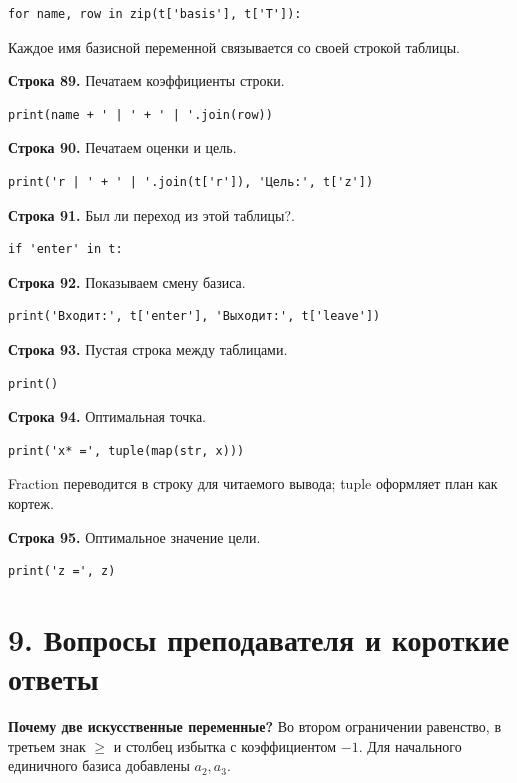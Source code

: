 \documentclass[12pt,a4paper]{article}
\begin{document}
\begin{Verbatim}[fontsize=\small,breaklines=true,breakanywhere=true]
    for name, row in zip(t['basis'], t['T']):
\end{Verbatim}
Каждое имя базисной переменной связывается со своей строкой таблицы.
\par\textbf{Строка 89.} Печатаем коэффициенты строки.
\begin{Verbatim}[fontsize=\small,breaklines=true,breakanywhere=true]
        print(name + ' | ' + ' | '.join(row))
\end{Verbatim}
\par\textbf{Строка 90.} Печатаем оценки и цель.
\begin{Verbatim}[fontsize=\small,breaklines=true,breakanywhere=true]
    print('r | ' + ' | '.join(t['r']), 'Цель:', t['z'])
\end{Verbatim}
\par\textbf{Строка 91.} Был ли переход из этой таблицы?.
\begin{Verbatim}[fontsize=\small,breaklines=true,breakanywhere=true]
    if 'enter' in t:
\end{Verbatim}
\par\textbf{Строка 92.} Показываем смену базиса.
\begin{Verbatim}[fontsize=\small,breaklines=true,breakanywhere=true]
        print('Входит:', t['enter'], 'Выходит:', t['leave'])
\end{Verbatim}
\par\textbf{Строка 93.} Пустая строка между таблицами.
\begin{Verbatim}[fontsize=\small,breaklines=true,breakanywhere=true]
    print()
\end{Verbatim}
\par\textbf{Строка 94.} Оптимальная точка.
\begin{Verbatim}[fontsize=\small,breaklines=true,breakanywhere=true]
print('x* =', tuple(map(str, x)))
\end{Verbatim}
Fraction переводится в строку для читаемого вывода; tuple оформляет план как кортеж.
\par\textbf{Строка 95.} Оптимальное значение цели.
\begin{Verbatim}[fontsize=\small,breaklines=true,breakanywhere=true]
print('z =', z)
\end{Verbatim}

\section*{9. Вопросы преподавателя и короткие ответы}
\textbf{Почему две искусственные переменные?}
Во втором ограничении равенство, в третьем знак $\ge$ и столбец избытка
с коэффициентом $-1$. Для начального единичного базиса добавлены $a_2,a_3$.
\end{document}
